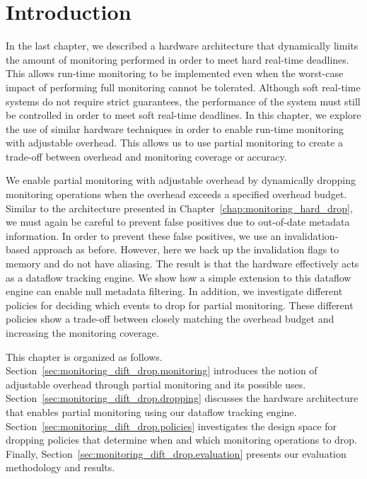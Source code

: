 \section{Introduction}
\label{sec:monitoring_dift_drop.introduction}

In the last chapter, we described a hardware architecture that dynamically
limits the amount of monitoring performed in order to meet hard real-time
deadlines. This allows run-time monitoring to be implemented even when the
worst-case impact of performing full monitoring cannot be tolerated. Although
soft real-time systems do not require strict guarantees, the performance of the
system must still be controlled in order to meet soft real-time deadlines.
In this chapter, we explore the use of similar hardware techniques in order to
enable run-time monitoring with adjustable overhead. This allows us to use
partial monitoring to create a trade-off between overhead and monitoring
coverage or accuracy.


We enable partial monitoring with adjustable overhead by dynamically dropping
monitoring operations when the overhead exceeds a specified overhead budget.
Similar to the architecture presented in
Chapter~\ref{chap:monitoring_hard_drop}, we must again be careful to prevent
false positives due to out-of-date metadata information. In order to prevent
these false positives, we use an invalidation-based approach as before.
However, here we back up the invalidation flags to memory and do not have
aliasing. The result is that the hardware effectively acts as a dataflow
tracking engine. We show how a simple extension to this dataflow engine can
enable null metadata filtering. In addition, we investigate different policies
for deciding which events to drop for partial monitoring.  These different
policies show a trade-off between closely matching the overhead budget and
increasing the monitoring coverage.

This chapter is organized as follows.
Section~\ref{sec:monitoring_dift_drop.monitoring} introduces the notion of
adjustable overhead through partial monitoring and its possible uses.
Section~\ref{sec:monitoring_dift_drop.dropping} discusses the hardware
architecture that enables partial monitoring using our dataflow tracking
engine.  Section~\ref{sec:monitoring_dift_drop.policies} investigates the
design space for dropping policies that determine when and which monitoring
operations to drop. Finally, Section~\ref{sec:monitoring_dift_drop.evaluation}
presents our evaluation methodology and results. 

